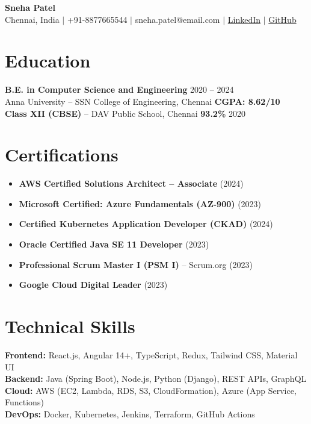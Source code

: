 \documentclass[10pt,a4paper]{article}
\begin{document}
\begin{center}
{\LARGE\bfseries Sneha Patel}\\[4pt]
{\small Chennai, India $\mid$ +91-8877665544 $\mid$ sneha.patel@email.com $\mid$ \href{https://linkedin.com/in/snehapatel-fullstack}{LinkedIn} $\mid$ \href{https://github.com/snehapatel}{GitHub}}
\end{center}

\section{Education}

\textbf{B.E. in Computer Science and Engineering} \hfill 2020 -- 2024\\
Anna University -- SSN College of Engineering, Chennai \hfill \textbf{CGPA: 8.62/10}\\[2pt]
\textbf{Class XII (CBSE)} -- DAV Public School, Chennai \hfill \textbf{93.2\%} \hfill 2020

\section{Certifications}

\begin{itemize}
    \item \textbf{AWS Certified Solutions Architect -- Associate} (2024)
    \item \textbf{Microsoft Certified: Azure Fundamentals (AZ-900)} (2023)
    \item \textbf{Certified Kubernetes Application Developer (CKAD)} (2024)
    \item \textbf{Oracle Certified Java SE 11 Developer} (2023)
    \item \textbf{Professional Scrum Master I (PSM I)} -- Scrum.org (2023)
    \item \textbf{Google Cloud Digital Leader} (2023)
\end{itemize}

\section{Technical Skills}

{\small
\textbf{Frontend:} React.js, Angular 14+, TypeScript, Redux, Tailwind CSS, Material UI\\
\textbf{Backend:} Java (Spring Boot), Node.js, Python (Django), REST APIs, GraphQL\\
\textbf{Cloud:} AWS (EC2, Lambda, RDS, S3, CloudFormation), Azure (App Service, Functions)\\
\textbf{DevOps:} Docker, Kubernetes, Jenkins, Terraform, GitHub Actions
}
\end{document}
